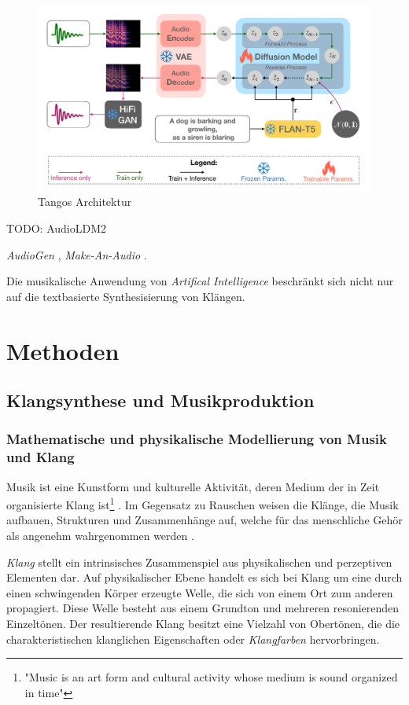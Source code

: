 \documentclass[
  a4paper,  %
  twoside,  %
  bibliography=totoc,
  headsepline,
  cleardoublepage=empty,
  parskip=half,
  draft=false
]{scrbook}
\begin{document}
\begin{figure}[h]
  \centering
  \includegraphics[width=.7\textwidth]{graphics/Tango.png}
  \caption[Tango Architektur]{Tangos Architektur \cite{liu_roberta_2019}}
  \label{fig:tango}
\end{figure}

TODO: AudioLDM2 

\emph{AudioGen} \cite{kreuk_audiogen_2023}, \emph{Make-An-Audio} \cite{huang_make--audio_2023}.


Die musikalische Anwendung von \emph{Artifical Intelligence} beschränkt sich nicht nur auf die textbasierte Synthesisierung von Klängen.







\chapter{Methoden}

\section{Klangsynthese und Musikproduktion}

\subsection{Mathematische und physikalische Modellierung von Musik und Klang}
\glqq Musik ist eine Kunstform und kulturelle Aktivität, deren Medium der in Zeit organisierte Klang ist\grqq \footnote{"Music is an art form and cultural activity whose medium is sound organized in time"} \cite{tsuji_physics_2021}. Im Gegensatz zu Rauschen weisen die Klänge, die Musik aufbauen, Strukturen und Zusammenhänge auf, welche für das menschliche Gehör als angenehm wahrgenommen werden \cite{parker_good_2009}. 

\emph{Klang} stellt ein intrinsisches Zusammenspiel aus physikalischen und perzeptiven Elementen dar. Auf physikalischer Ebene handelt es sich bei Klang um eine durch einen schwingenden Körper erzeugte Welle, die sich von einem Ort zum anderen propagiert. Diese Welle besteht aus einem Grundton und mehreren resonierenden Einzeltönen. Der resultierende Klang besitzt eine Vielzahl von Obertönen, die die charakteristischen klanglichen Eigenschaften oder \emph{Klangfarben} hervorbringen. \cite{tsuji_physics_2021, parker_good_2009}
\end{document}
